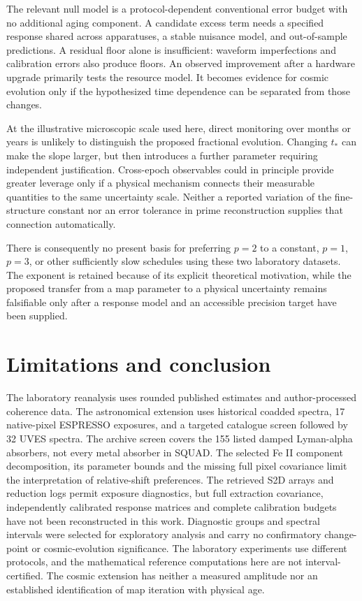 \documentclass[aps,pra,onecolumn,amsmath,amssymb,nofootinbib,superscriptaddress,floatfix,11pt]{revtex4-2}
\begin{document}
The relevant null model is a protocol-dependent conventional error budget with no additional aging component. A candidate excess term needs a specified response shared across apparatuses, a stable nuisance model, and out-of-sample predictions. A residual floor alone is insufficient: waveform imperfections and calibration errors also produce floors. An observed improvement after a hardware upgrade primarily tests the resource model. It becomes evidence for cosmic evolution only if the hypothesized time dependence can be separated from those changes.

At the illustrative microscopic scale used here, direct monitoring over months or years is unlikely to distinguish the proposed fractional evolution. Changing $t_\ast$ can make the slope larger, but then introduces a further parameter requiring independent justification. Cross-epoch observables could in principle provide greater leverage only if a physical mechanism connects their measurable quantities to the same uncertainty scale. Neither a reported variation of the fine-structure constant nor an error tolerance in prime reconstruction supplies that connection automatically.

There is consequently no present basis for preferring $p=2$ to a constant, $p=1$, $p=3$, or other sufficiently slow schedules using these two laboratory datasets. The exponent is retained because of its explicit theoretical motivation, while the proposed transfer from a map parameter to a physical uncertainty remains falsifiable only after a response model and an accessible precision target have been supplied.

\section{Limitations and conclusion}
The laboratory reanalysis uses rounded published estimates and author-processed coherence data. The astronomical extension uses historical coadded spectra, 17 native-pixel ESPRESSO exposures, and a targeted catalogue screen followed by 32 UVES spectra. The archive screen covers the 155 listed damped Lyman-alpha absorbers, not every metal absorber in SQUAD. The selected Fe II component decomposition, its parameter bounds and the missing full pixel covariance limit the interpretation of relative-shift preferences. The retrieved S2D arrays and reduction logs permit exposure diagnostics, but full extraction covariance, independently calibrated response matrices and complete calibration budgets have not been reconstructed in this work. Diagnostic groups and spectral intervals were selected for exploratory analysis and carry no confirmatory change-point or cosmic-evolution significance. The laboratory experiments use different protocols, and the mathematical reference computations here are not interval-certified. The cosmic extension has neither a measured amplitude nor an established identification of map iteration with physical age.
\end{document}
